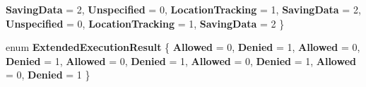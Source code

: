 \begin{DoxyCompactItemize}
\newline
{\bfseries Saving\+Data} = 2, 
{\bfseries Unspecified} = 0, 
{\bfseries Location\+Tracking} = 1, 
{\bfseries Saving\+Data} = 2, 
\newline
{\bfseries Unspecified} = 0, 
{\bfseries Location\+Tracking} = 1, 
{\bfseries Saving\+Data} = 2
 \}
\item 
\mbox{\label{namespace_windows_1_1_application_model_1_1_extended_execution_a24027557babcb8bc4950e24a373e5677}} 
enum {\bfseries Extended\+Execution\+Result} \{ \newline
{\bfseries Allowed} = 0, 
{\bfseries Denied} = 1, 
{\bfseries Allowed} = 0, 
{\bfseries Denied} = 1, 
\newline
{\bfseries Allowed} = 0, 
{\bfseries Denied} = 1, 
{\bfseries Allowed} = 0, 
{\bfseries Denied} = 1, 
\newline
{\bfseries Allowed} = 0, 
{\bfseries Denied} = 1
 \}
\end{DoxyCompactItemize}
